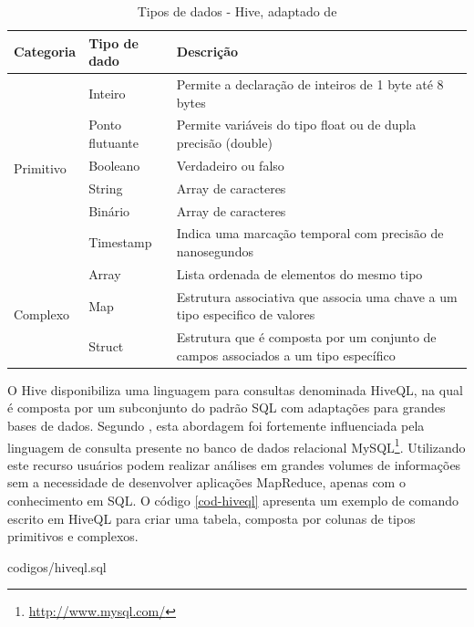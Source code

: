 \begin{table}[!ht]
\begin{center}
  \begin{tabular}{|p{3cm}|p{4cm}|p{4cm}|}
  \hline
  Categoria & Tipo de dado & Descrição \\ 
  \hline
  \multirow{6}{*}{Primitivo} 
  & Inteiro 		& Permite a declaração de inteiros de 1 byte até 8 bytes \\ \cline{2-3} 
  & Ponto flutuante 	& Permite variáveis do tipo float ou de dupla precisão (double) \\ \cline{2-3}
  & Booleano		& Verdadeiro ou falso \\ \cline{2-3}
  & String 		& Array de caracteres \\ \cline{2-3}
  & Binário 		& Array de caracteres \\ \cline{2-3}
  & Timestamp 		& Indica uma marcação temporal com precisão de nanosegundos \\
  \hline
  \multirow{3}{*}{Complexo} 
  & Array 		& Lista ordenada de elementos do mesmo tipo \\ \cline{2-3} 
  & Map 		& Estrutura associativa que associa uma chave a um tipo especifico de valores \\ \cline{2-3}
  & Struct		& Estrutura que é composta por um conjunto de campos associados a um tipo específico \\
  \hline
  \end{tabular}
  \caption{Tipos de dados - Hive, adaptado de 
  }
\label{tab-hive-types}
\end{center}
\end{table}
\FloatBarrier

O Hive disponibiliza uma linguagem para consultas denominada HiveQL, na qual é composta por um subconjunto do padrão SQL com adaptações para grandes bases de dados. Segundo , esta abordagem foi fortemente influenciada pela linguagem de consulta presente no banco de dados relacional MySQL\footnote{\url{http://www.mysql.com/}}. Utilizando este recurso usuários podem realizar análises em grandes volumes de informações sem a necessidade de desenvolver aplicações MapReduce, apenas com o conhecimento em SQL. O código \ref{cod-hiveql} apresenta um exemplo de comando escrito em HiveQL para criar uma tabela, composta por colunas de tipos primitivos e complexos.


		{codigos/hiveql.sql}
\FloatBarrier

